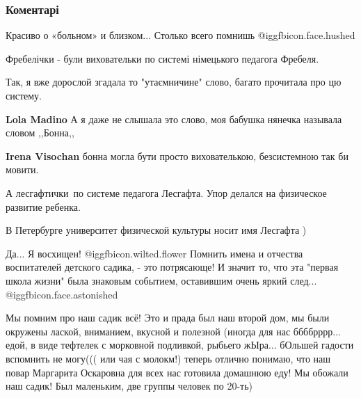  
 
 
 
 
\subsubsection{Коментарі}

\begin{itemize} %
Красиво о «больном» и близком... Столько всего помнишь  @igg{fbicon.face.hushed} 

Фребелічки - були виховательки по системі німецького педагога Фребеля.

\begin{itemize} %
Так, я вже дорослой згадала то "утаємничине" слово, багато прочитала про цю систему.

\textbf{Lola Madino} А я даже не слышала это слово, моя бабушка нянечка называла словом ,,Бонна,,

\textbf{Irena Visochan} бонна могла бути просто вихователькою, безсистемною так би мовити.

А лесгафтички~по системе педагога Лесгафта. Упор делался на физическое развитие ребенка.

В Петербурге университет физической культуры носит имя Лесгафта )
\end{itemize} %


Да... Я восхищен! @igg{fbicon.wilted.flower}  Помнить имена и отчества воспитателей детского садика, -
это потрясающе! И значит то, что эта "первая школа жизни" была знаковым
событием, оставившим очень яркий след... @igg{fbicon.face.astonished} 

\begin{itemize} %

Мы помним про наш садик всё! Это и прада был наш второй дом, мы были окружены
лаской, вниманием, вкусной и полезной (иногда для нас ббббрррр... едой, в виде
тефтелек с морковной подливкой, рыбьего жЫра... бОльшей гадости вспомнить не
могу((( или чая с молокм!) теперь отлично понимаю, что наш повар Маргарита
Оскаровна для всех нас готовила домашнюю еду! Мы обожали наш садик! Был
маленьким, две группы человек по 20-ть)


\end{itemize}
\end{itemize}
